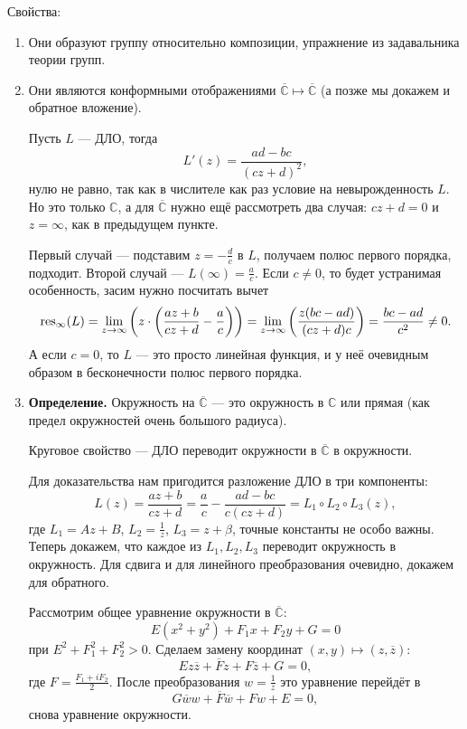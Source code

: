 Свойства:
\begin{enumerate}
    \item Они образуют группу относительно композиции, упражнение из задавальника теории групп.
    \item Они являются конформными отображениями $\overline{\mathbb C} \mapsto \overline{\mathbb C}$ (а позже мы докажем и обратное вложение).

        Пусть $L$ --- ДЛО, тогда
        \[
            L'(z) = \frac{ad - bc}{(cz + d)^2},
        \]
        нулю не равно, так как в числителе как раз условие на невырожденность $L$.
        Но это только $\mathbb C$, а для $\overline{\mathbb C}$ нужно ещё рассмотреть два случая: $cz + d = 0$ и $z = \infty$, как в предыдущем пункте.

        Первый случай --- подставим $z = -\frac{d}{c}$ в $L$, получаем полюс первого порядка, подходит.
        Второй случай --- $L(\infty) = \frac{a}{c}$.
        Если $c \ne 0$, то будет устранимая особенность, засим нужно посчитать вычет
        \[
            \operatorname{res}_\infty(L) = \lim_{z \to \infty} \left( z \cdot \left( \frac{az + b}{cz + d} - \frac{a}{c} \right) \right) = \lim_{z \to \infty} \left( \frac{z(bc - ad)}{(cz + d)c} \right) = \frac{bc - ad}{c^2} \ne 0.
        \]
        А если $c = 0$, то $L$ --- это просто линейная функция, и у неё очевидным образом в бесконечности полюс первого порядка.

    \item 
        \textbf{Определение.} Окружность на $\overline{\mathbb C}$ --- это окружность в $\mathbb C$ или прямая (как предел окружностей очень большого радиуса).

        Круговое свойство --- ДЛО переводит окружности в $\overline{\mathbb C}$ в окружности.
        
        Для доказательства нам пригодится разложение ДЛО в три компоненты:
        \[
            L(z) = \frac{az + b}{cz + d} = \frac{a}{c} - \frac{ad - bc}{c(cz + d)} = L_1 \circ L_2 \circ L_3(z),
        \]
        где $L_1 = Az + B$, $L_2 = \frac{1}{z}$, $L_3 = z + \beta$, точные константы не особо важны.
        Теперь докажем, что каждое из $L_1, L_2, L_3$ переводит окружность в окружность.
        Для сдвига и для линейного преобразования очевидно, докажем для обратного.

        Рассмотрим общее уравнение окружности в $\overline{\mathbb C}$:
        \[
            E(x^2 + y^2) + F_1 x + F_2 y + G = 0
        \]
        при $E^2 + F_1^2 + F_2^2 > 0$.
        Сделаем замену координат $(x, y) \mapsto (z, \overline z)$:
        \[
            Ez \overline z + \overline F z + F \overline z + G = 0,
        \]
        где $F = \frac{F_1 + iF_2}{2}$.
        После преобразования $w = \frac{1}{z}$ это уравнение перейдёт в 
        \[
            G\overline w w + \overline F \overline w + Fw + E = 0,
        \]
        снова уравнение окружности.


\end{enumerate}
